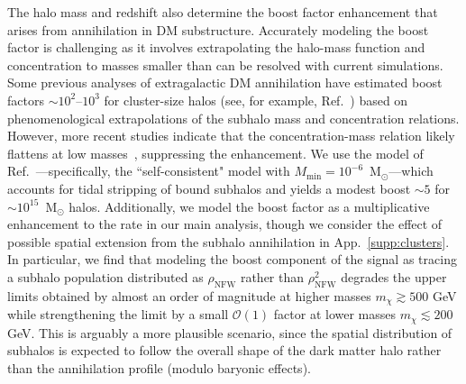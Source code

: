 The halo mass and redshift also determine the boost factor enhancement that arises from annihilation in DM substructure.  Accurately modeling the boost factor is challenging as it involves extrapolating the halo-mass function and concentration to masses smaller than can be resolved with current simulations.  Some previous analyses of extragalactic DM annihilation have estimated boost factors $\sim$$10^2$--$10^3$ for cluster-size halos (see, for example, Ref.~\cite{Gao:2011rf}) based on phenomenological extrapolations of the subhalo mass and concentration relations.  However, more recent studies indicate that the concentration-mass relation likely flattens at low masses~\cite{Anderhalden:2013wd,Ludlow:2013vxa,Correa:2015dva}, suppressing the enhancement. We use the model of Ref.~\cite{Bartels:2015uba}---specifically, the ``self-consistent" model with $M_\text{min} = 10^{-6}$~M$_\odot$---which accounts for tidal stripping of bound subhalos and yields a modest boost $\sim$$5$ for $\sim$$10^{15}$~M$_\odot$ halos. Additionally, we model the boost factor as a multiplicative enhancement to the rate in our main analysis, though we consider the effect of possible spatial extension from the subhalo annihilation in App.~\ref{supp:clusters}. In particular, we find that modeling the boost component of the signal as tracing a subhalo population distributed as $\rho_\text{NFW}$ rather than $\rho^{2}_\text{NFW}$ degrades the upper limits obtained by almost an order of magnitude at higher masses $m_\chi \gtrsim 500$ GeV while strengthening the limit by a small $\mathcal O(1)$ factor at lower masses $m_\chi \lesssim 200$ GeV. This is arguably a more plausible scenario, since the spatial distribution of subhalos  is expected to follow the overall shape of the dark matter halo rather than the annihilation profile (modulo baryonic effects).

